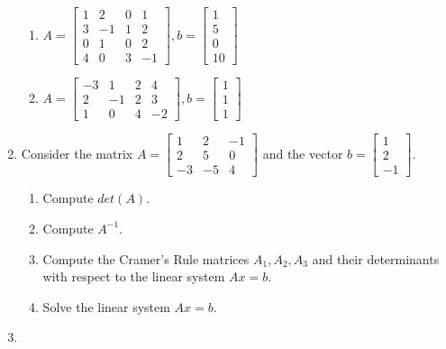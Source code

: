 \documentclass{article}
\begin{document}
\begin{enumerate}
\begin{enumerate}
\item \(
 A = \begin{bmatrix}
  1 & 2 & 0 & 1 \\
  3 & -1 & 1 & 2 \\
  0 & 1 & 0 & 2 \\
  4 & 0 & 3 & -1
 \end{bmatrix},
 b = \begin{bmatrix} 1 \\ 5 \\ 0 \\ 10 \end{bmatrix}
\)
\item \(
 A = \begin{bmatrix}
  -3 &  1 & 2 &  4 \\
   2 & -1 & 2 &  3 \\
   1 &  0 & 4 & -2
 \end{bmatrix},
 b = \begin{bmatrix} 1 \\ 1 \\ 1 \end{bmatrix}
\)
\end{enumerate}

\item 

Consider the matrix \( A = \begin{bmatrix}
 1 & 2 & -1 \\
 2 & 5 & 0 \\
 -3 & -5 & 4
\end{bmatrix} \) and the vector \(b =
\begin{bmatrix} 1 \\ 2 \\ -1 \end{bmatrix} \).
\begin{enumerate}
\item Compute $det(A)$.
\item Compute $A^{-1}$.
\item Compute the Cramer's Rule matrices $A_1, A_2, A_3$ and their 
determinants with respect to the linear system $Ax = b$.
\item Solve the linear system $Ax = b$.
\end{enumerate}

\item 


\end{enumerate}
\end{document}
